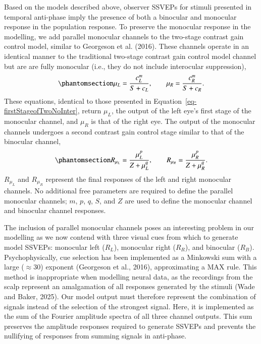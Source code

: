 \documentclass[review,
  12pt,
]{elsarticle}
\begin{document}
Based on the models described above, observer SSVEPs for stimuli
presented in temporal anti-phase imply the presence of both a binocular
and monocular response in the population response. To preserve the
monocular response in the modelling, we add parallel monocular channels
to the two-stage contrast gain control model, similar to Georgeson et
al. (2016). These channels operate in an identical manner to the
traditional two-stage contrast gain control model channel but are are
fully monocular (i.e., they do not include interocular suppression),
\begin{equation}\phantomsection\label{eq-monocFirstStage}{
\mu_L = \frac{c_L^m}{S + c_L}, \qquad  \mu_R = \frac{c_R^m}{S + c_R}.
}\end{equation} These equations, identical to those presented in
Equation~\ref{eq-firstStageofTwoNoInter}, return \(\mu_L\), the output
of the left eye's first stage of the monocular channel, and \(\mu_R\) is
that of the right eye. The output of the monocular channels undergoes a
second contrast gain control stage similar to that of the binocular
channel, \begin{equation}\phantomsection\label{eq-monocSecondStage}{
R_{\mu_L} = \frac{\mu_L^p}{Z + \mu_L^q}, \qquad  R_{\mu_R} = \frac{\mu_R^p}{Z + \mu_R^q}.
}\end{equation} \(R_{\mu_L}\) and \(R_{\mu_R}\) represent the final
responses of the left and right monocular channels. No additional free
parameters are required to define the parallel monocular channels;
\(m\), \(p\), \(q\), \(S\), and \(Z\) are used to define the monocular
channel and binocular channel responses.

The inclusion of parallel monocular channels poses an interesting
problem in our modelling as we now contend with three visual cues from
which to generate model SSVEPs: monocular left (\(R_L\)), monocular
right (\(R_R\)), and binocular (\(R_B\)). Psychophysically, cue
selection has been implemented as a Minkowski sum with a large
(\(\approx 30\)) exponent (Georgeson et al., 2016), approximating a MAX
rule. This method is inappropriate when modelling neural data, as the
recordings from the scalp represent an amalgamation of all responses
generated by the stimuli (Wade and Baker, 2025). Our model output must
therefore represent the combination of signals instead of the selection
of the strongest signal. Here, it is implemented as the sum of the
Fourier amplitude spectra of all three channel outputs. This sum
preserves the amplitude responses required to generate SSVEPs and
prevents the nullifying of responses from summing signals in anti-phase.
\end{document}
